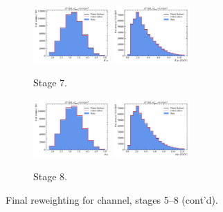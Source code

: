 \begin{figure}[htb]
    \begin{subfigure}{\textwidth}
        \centering
        \includegraphics[width=0.32\textwidth]{./figs-mc-correction/reweighting-final/plot_step7-D0_iso-k_eta.pdf}
        \includegraphics[width=0.32\textwidth]{./figs-mc-correction/reweighting-final/plot_step7-D0_iso-k_pt.pdf}
        \caption{Stage 7.}
    \end{subfigure}

    \begin{subfigure}{\textwidth}
        \centering
        \includegraphics[width=0.32\textwidth]{./figs-mc-correction/reweighting-final/plot_step8-D0_iso-pi_eta.pdf}
        \includegraphics[width=0.32\textwidth]{./figs-mc-correction/reweighting-final/plot_step8-D0_iso-pi_pt.pdf}
        \caption{Stage 8.}
    \end{subfigure}

    \caption[]{Final reweighting for \Dz channel, stages 5--8 (cont'd).}
\end{figure}

